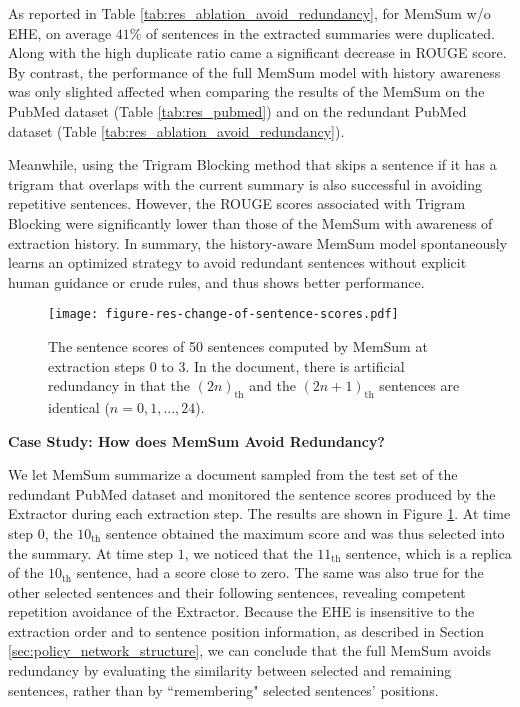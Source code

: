 \documentclass[11pt]{article}
\begin{document}
As reported in Table \ref{tab:res_ablation_avoid_redundancy}, for  MemSum w/o EHE, on average $41\%$ of sentences in the extracted summaries were duplicated. Along with the high duplicate ratio came a significant decrease in ROUGE score. By contrast, the performance of the full MemSum model with history awareness was only slighted affected when comparing the results of the MemSum on the PubMed dataset (Table \ref{tab:res_pubmed}) and on the redundant PubMed dataset (Table \ref{tab:res_ablation_avoid_redundancy}).

Meanwhile, using the Trigram Blocking method that skips a sentence if it has a trigram that overlaps with the current summary \cite{liu2019text} is also successful in avoiding repetitive sentences. However, the ROUGE scores associated with Trigram Blocking were significantly lower than those of the  MemSum with awareness of extraction history. In summary, the history-aware MemSum model spontaneously learns an optimized strategy to avoid redundant sentences without explicit human guidance or crude rules, and thus shows better performance.

\begin{figure}
\centering
  \texttt{[image: figure-res-change-of-sentence-scores.pdf]}
  \caption{The sentence scores of 50 sentences computed by MemSum at extraction steps 0 to 3. In the document, there is artificial redundancy in that the $(2n)_{\text{th}}$ and the $(2n+1)_{\text{th}}$ sentences are identical ($n=0,1,...,24$). }
  \label{fig:score_change}
\end{figure}

\noindent\textbf{Case Study: How does MemSum Avoid Redundancy?} 

We let MemSum summarize a document sampled from the test set of the redundant PubMed dataset and monitored the sentence scores produced by the Extractor during each extraction step. The results are shown in Figure \ref{fig:score_change}. At time step $0$, the $10_{\text{th}}$ sentence obtained the maximum score and was thus selected into the summary. At time step $1$, we noticed that the $11_\text{th}$ sentence, which is a replica of the $10_\text{th}$ sentence, had a score close to zero. The same was also true for the other selected sentences and their following sentences, revealing competent repetition avoidance of the Extractor. 
Because the EHE is insensitive to the extraction order and to sentence position information, as described in Section \ref{sec:policy_network_structure}, we can conclude that the full MemSum avoids redundancy by evaluating the similarity between selected and remaining sentences, rather than by ``remembering" selected sentences' positions.
\end{document}
